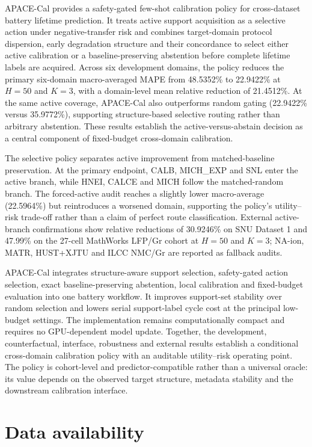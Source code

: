 \documentclass[preprint,12pt]{elsarticle}
\begin{document}
APACE-Cal provides a safety-gated few-shot calibration policy for cross-dataset battery lifetime prediction. It treats active support acquisition as a selective action under negative-transfer risk and combines target-domain protocol dispersion, early degradation structure and their concordance to select either active calibration or a baseline-preserving abstention before complete lifetime labels are acquired. Across six development domains, the policy reduces the primary six-domain macro-averaged MAPE from 48.5352\% to 22.9422\% at $H=50$ and $K=3$, with a domain-level mean relative reduction of 21.4512\%. At the same active coverage, APACE-Cal also outperforms random gating (22.9422\% versus 35.9772\%), supporting structure-based selective routing rather than arbitrary abstention. These results establish the active-versus-abstain decision as a central component of fixed-budget cross-domain calibration.

The selective policy separates active improvement from matched-baseline preservation. At the primary endpoint, CALB, MICH\_EXP and SNL enter the active branch, while HNEI, CALCE and MICH follow the matched-random branch. The forced-active audit reaches a slightly lower macro-average (22.5964\%) but reintroduces a worsened domain, supporting the policy's utility--risk trade-off rather than a claim of perfect route classification. External active-branch confirmations show relative reductions of 30.9246\% on SNU Dataset 1 and 47.99\% on the 27-cell MathWorks LFP/Gr cohort at $H=50$ and $K=3$; NA-ion, MATR, HUST+XJTU and ILCC NMC/Gr are reported as fallback audits.

APACE-Cal integrates structure-aware support selection, safety-gated action selection, exact baseline-preserving abstention, local calibration and fixed-budget evaluation into one battery workflow. It improves support-set stability over random selection and lowers serial support-label cycle cost at the principal low-budget settings. The implementation remains computationally compact and requires no GPU-dependent model update. Together, the development, counterfactual, interface, robustness and external results establish a conditional cross-domain calibration policy with an auditable utility--risk operating point. The policy is cohort-level and predictor-compatible rather than a universal oracle: its value depends on the observed target structure, metadata stability and the downstream calibration interface.

\section*{Data availability}
\end{document}
